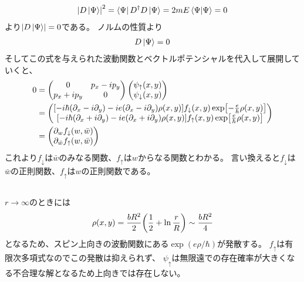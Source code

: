 \documentclass[../../sp_2015.tex]{subfiles}
\begin{document}
\subsection{}
\begin{equation}\begin{aligned}[b]
    \abs{D\ket{\Psi}}^2=\bra{\Psi}D^\dagger D\ket{\Psi}=2mE\braket{\Psi}=0
\end{aligned}\end{equation}
より\(\abs{D\ket{\Psi}}=0\)である。
ノルムの性質より
\begin{equation}\begin{aligned}[b]
    D\ket{\Psi}=0
\end{aligned}\end{equation}
そしてこの式を与えられた波動関数とベクトルポテンシャルを代入して展開していくと、
\begin{equation}\begin{aligned}[b]
    0&=\begin{pmatrix}
        0 & p_x-ip_y\\p_x+ip_y & 0
    \end{pmatrix}\begin{pmatrix}
        \psi_{\uparrow}(x,y)\\\psi_{\downarrow}(x,y)
    \end{pmatrix}\\
    &=\begin{pmatrix}
        \qty[-i\hbar\qty(\partial_x-i\partial_y)-ie(\partial_x-i\partial_y)\rho(x,y)]f_{\downarrow}(x,y)\exp[-\frac{e}{\hbar}\rho(x,y)]\\
        \qty[-i\hbar\qty(\partial_x+i\partial_y)-ie(\partial_x+i\partial_y)\rho(x,y)]f_{\uparrow}(x,y)\exp[\frac{e}{\hbar}\rho(x,y)]
    \end{pmatrix}\\
    &= \begin{pmatrix}
        \partial_w f_{\downarrow}(w,\bar{w})\\
        \partial_{\bar{w}} f_{\uparrow}(w,\bar{w})\\
    \end{pmatrix}
\end{aligned}\end{equation}
これより\(f_\downarrow\)は\(\bar{w}\)のみなる関数、\(f_\uparrow\)は\(w\)からなる関数とわかる。
言い換えると\(f_\downarrow\)は\(\bar{w}\)の正則関数、\(f_\uparrow\)は\(w\)の正則関数である。

\subsection{}
\(r\to\infty\)のときには
\begin{equation}\begin{aligned}[b]
    \rho(x,y)=\frac{bR^2}{2}\qty(\frac{1}{2}+\ln\frac{r}{R})\sim\frac{bR^2}{4}
\end{aligned}\end{equation}
となるため、スピン上向きの波動関数にある\(\exp(e\rho/\hbar)\)が発散する。
\(f_\uparrow\)は有限次多項式なのでこの発散は抑えられず、
\(\psi_\uparrow\)は無限遠での存在確率が大きくなる不合理な解となるため上向きでは存在しない。
\end{document}
